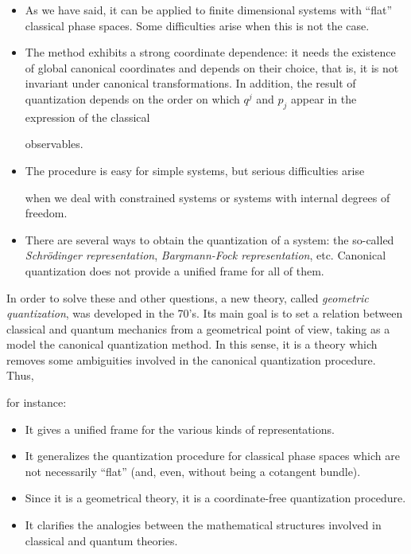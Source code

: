 \documentclass[12pt]{article}
\begin{document}
\begin{itemize}
\item
As we have said, it can be applied to finite dimensional systems
with ``flat'' classical phase spaces. Some difficulties arise when this
is not the case.
\item
The method exhibits a strong coordinate dependence:
it needs the existence of global canonical coordinates and depends on
their choice,
that is, it is not invariant under canonical transformations.
In addition, the result of quantization depends on the
order on which $q^j$ and $p_j$ appear in the expression of the classical

observables.
\item
The procedure is easy for simple systems, but serious difficulties arise

when we deal with
constrained systems or systems with internal degrees of freedom.
\item
There are several ways to obtain the quantization of a system: the
so-called
{\it Schr\"odinger representation}, {\it Bargmann-Fock representation},
etc. Canonical quantization does not provide a unified frame for all of
them.
\end{itemize}

In order to solve these and other questions,
a new theory, called {\it geometric quantization}, was developed in the
70's.
Its main goal is to set a relation between
classical and quantum mechanics from a geometrical point of view,
taking as a model the canonical quantization method.
In this sense, it is a theory which removes
some ambiguities involved in the canonical quantization procedure. Thus,

for instance:
\begin{itemize}
\item
It gives a unified frame for the various kinds of representations.
\item
It generalizes the quantization procedure for classical
phase spaces which are not necessarily ``flat''
(and, even, without being a cotangent bundle).
\item
Since it is a geometrical theory, it is a coordinate-free quantization
procedure.
\item
It clarifies the analogies between the mathematical
structures involved in classical and quantum theories.
\end{itemize}
\end{document}
